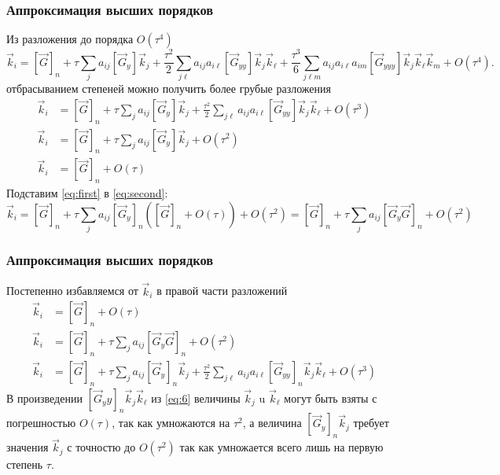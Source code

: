 \documentclass[professionalfonts,compress,unicode,aspectratio=169]{beamer}
\begin{document}
\begin{frame}\frametitle{Аппроксимация высших порядков}
	Из разложения до порядка $O(\tau^4)$
	\[
	\vec k_i = [\vec G]_n + \tau \sum_j a_{ij} [\vec G_y] \vec k_j
	+ \frac{\tau^2}{2} \sum_{j\ell} a_{ij}a_{i\ell}[\vec G_{yy}] \vec k_j \vec k_\ell
	+ \frac{\tau^3}{6} \sum_{j\ell m} a_{ij} a_{i\ell} a_{im} [\vec G_{yyy}] \vec k_j
	\vec k_\ell \vec k_m + O(\tau^4).
	\]
	отбрасыванием степеней можно получить более грубые разложения
	\begin{align}
	\label{eq:third}
	\vec k_i &= [\vec G]_n + \tau \sum_j a_{ij} [\vec G_y] \vec k_j
	+ \frac{\tau^2}{2} \sum_{j\ell} a_{ij}a_{i\ell}[\vec G_{yy}] \vec k_j \vec k_\ell
	+ O(\tau^3)\\
	\label{eq:second}
	\vec k_i &= [\vec G]_n + \tau \sum_j a_{ij} [\vec G_y] \vec k_j +
O(\tau^2)\\
	\label{eq:first}
	\vec k_i &= [\vec G]_n + O(\tau)
	\end{align}
	Подставим \eqref{eq:first} в \eqref{eq:second}:
	\[
	\textstyle
	\vec k_i = [\vec G]_n + \tau \sum_j a_{ij} [\vec G_y]_n ([\vec G]_n + O(\tau))
+ O(\tau^2) =
	[\vec G]_n + \tau \sum_j a_{ij} [\vec G_y \vec G]_n + O(\tau^2)
	\]
\end{frame}

\begin{frame}\frametitle{Аппроксимация высших порядков}
	Постепенно избавляемся от $\vec k_i$ в правой части разложений
	\begin{align}
	\label{eq:4}
	\vec k_i &= [\vec G]_n + O(\tau)\\
	\label{eq:5}
	\vec k_i &= [\vec G]_n + \tau \sum_j a_{ij} [\vec G_y \vec G]_n +
O(\tau^2)\\
	\label{eq:6}
	\vec k_i &= [\vec G]_n + \tau \sum_j a_{ij} [\vec G_y]_n \vec k_j
	+ \frac{\tau^2}{2} \sum_{j\ell} a_{ij}a_{i\ell}[\vec G_{yy}]_n \vec k_j \vec k_\ell
	+ O(\tau^3)
	\end{align}
	В произведении $[\vec G_yy]_n\vec k_j\vec k_\ell$ из \eqref{eq:6} величины $\vec k_j$ u
$\vec k_\ell$ могут быть взяты с погрешностью $O(\tau)$, так как умножаются на
$\tau^2$, а величина $[\vec G_y]_n\vec k_j$ требует значения $\vec k_j$ с точностю
до $O(\tau^2)$ так как умножается всего лишь на первую степень $\tau$.
\end{frame}
\end{document}
